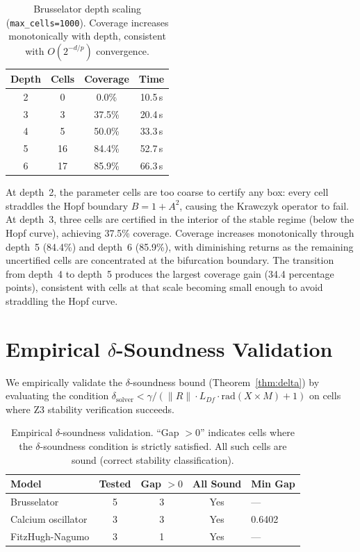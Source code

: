 \documentclass[11pt]{article}
\newcommand{\norm}[1]{\|#1\|}
\begin{document}
\begin{table}[h]
\centering
\caption{Brusselator depth scaling (\texttt{max\_cells=1000}).  Coverage increases monotonically with depth, consistent with $O(2^{-d/p})$ convergence.}
\label{tab:depth-scaling}
\small
\begin{tabular}{@{}cccc@{}}
\toprule
Depth & Cells & Coverage & Time \\
\midrule
2 & 0  & 0.0\%  & 10.5\,s \\
3 & 3  & 37.5\% & 20.4\,s \\
4 & 5  & 50.0\% & 33.3\,s \\
5 & 16 & 84.4\% & 52.7\,s \\
6 & 17 & 85.9\% & 66.3\,s \\
\bottomrule
\end{tabular}
\end{table}

At depth~2, the parameter cells are too coarse to certify any box: every cell straddles the Hopf boundary $B = 1 + A^2$, causing the Krawczyk operator to fail.
At depth~3, three cells are certified in the interior of the stable regime (below the Hopf curve), achieving 37.5\% coverage.
Coverage increases monotonically through depth~5 (84.4\%) and depth~6 (85.9\%), with diminishing returns as the remaining uncertified cells are concentrated at the bifurcation boundary.
The transition from depth~4 to depth~5 produces the largest coverage gain (34.4 percentage points), consistent with cells at that scale becoming small enough to avoid straddling the Hopf curve.

\section{Empirical $\delta$-Soundness Validation}
\label{app:delta-empirical}

We empirically validate the $\delta$-soundness bound (Theorem~\ref{thm:delta}) by evaluating the condition $\delta_{\mathrm{solver}} < \gamma / (\norm{R} \cdot L_{Df} \cdot \mathrm{rad}(X \times M) + 1)$ on cells where Z3 stability verification succeeds.

\begin{table}[h]
\centering
\caption{Empirical $\delta$-soundness validation.  ``Gap $> 0$'' indicates cells where the $\delta$-soundness condition is strictly satisfied.  All such cells are sound (correct stability classification).}
\label{tab:delta-empirical}
\small
\begin{tabular}{@{}lcccl@{}}
\toprule
Model & Tested & Gap $> 0$ & All Sound & Min Gap \\
\midrule
Brusselator        & 5 & 3 & Yes & --- \\
Calcium oscillator & 3 & 3 & Yes & 0.6402 \\
FitzHugh-Nagumo    & 3 & 1 & Yes & --- \\
\bottomrule
\end{tabular}
\end{table}
\end{document}
